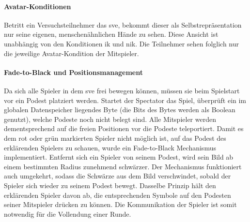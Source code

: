\documentclass[a4paper,11pt]{article}%
\renewcommand{\\}{\vspace*{0.5\baselineskip} \newline}
\begin{document}
\paragraph{Avatar-Konditionen}
Betritt ein Versuchsteilnehmer das \ac{sve}, bekommt dieser als Selbstrepräsentation nur seine eigenen, menschenähnlichen Hände zu sehen. Diese Ansicht ist unabhängig von den Konditionen \ac{ik} und \ac{nik}. Die Teilnehmer sehen folglich nur die jeweilige Avatar-Kondition der Mitspieler. 

\paragraph{Fade-to-Black und Positionsmanagement}
	Da sich alle Spieler in dem \ac{sve} frei bewegen können, müssen sie beim Spielstart vor ein Podest platziert werden. Startet der Spectator das Spiel, überprüft ein im globalen Datenspeicher liegendes Byte (die Bits des Bytes werden als Boolean genutzt), welche Podeste noch nicht belegt sind. Alle Mitspieler werden dementsprechend auf die freien Positionen vor die Podeste teleportiert. Damit es dem rot oder grün markierten Spieler nicht möglich ist, auf das Podest des erklärenden Spielers zu schauen, wurde ein Fade-to-Black Mechanismus implementiert. Entfernt sich ein Spieler von seinem Podest, wird sein Bild ab einem bestimmten Radius zunehmend schwärzer. Der Mechanismus funktioniert auch umgekehrt, sodass die Schwärze aus dem Bild verschwindet, sobald der Spieler sich wieder zu seinem Podest bewegt. Dasselbe Prinzip hält den erklärenden Spieler davon ab, die entsprechenden Symbole auf den Podesten seiner Mitspieler drücken zu können. Die Kommunikation der Spieler ist somit notwendig für die Vollendung einer Runde.

\end{document}
